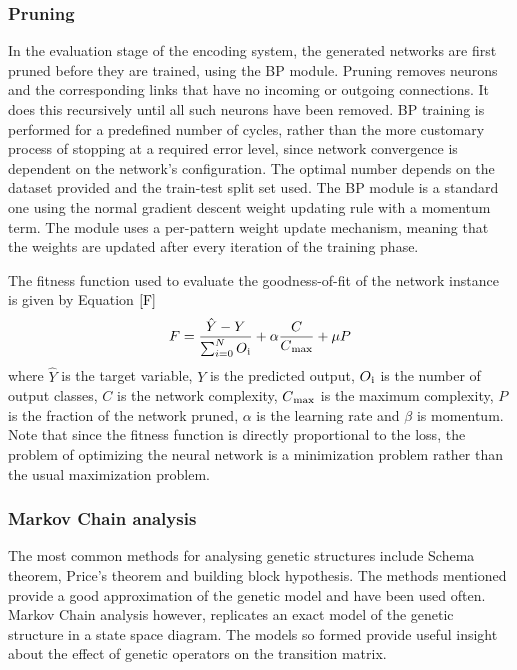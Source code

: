\documentclass[conference]{IEEEtran}
\begin{document}
\subsubsection{\textbf{Pruning}}
In the evaluation stage of the encoding system, the generated networks are first pruned before they are trained, using the BP module. Pruning removes neurons and the corresponding links that have no incoming or outgoing connections. It does this recursively until all such neurons have been removed. BP training is performed for a predefined number of cycles, rather than the more customary process of stopping at a required error level, since network convergence is dependent on the network's configuration. The optimal number depends on the dataset provided and the train-test split set used. The BP module is a standard one using the normal gradient descent weight updating rule with a momentum term. The module uses a per-pattern weight update mechanism, meaning that the weights are updated after every iteration of the training phase.

The fitness function used to evaluate the goodness-of-fit of the network instance is given by Equation $\ref{F}$ 
\begin{equation}
F = \frac{\hat{Y}-Y}{\sum_{i=0}^{N}O\textsubscript{i}} + \alpha\frac{C}{C\textsubscript{max}} + \mu P
\label{F}
\end{equation}
where $\hat{Y}$ is the target variable, $Y$ is the predicted output, $O\textsubscript{i}$ is the number of output classes, $C$ is the network complexity, $C\textsubscript{max}$ is the maximum complexity, $P$ is the fraction of the network pruned, $\alpha$ is the learning rate and $\beta$ is momentum.  Note that since the fitness function is directly proportional to the loss, the problem of optimizing the neural network is a minimization problem rather than the usual maximization problem. 

\subsubsection{\textbf{Markov Chain analysis}}

The most common methods for analysing genetic structures include Schema theorem, Price's theorem and building block hypothesis. The methods mentioned provide a good approximation of the genetic model and have been used often. Markov Chain analysis however, replicates an exact model of the genetic structure in a state space diagram. The models so formed provide useful insight about the effect of genetic operators on the transition matrix.  
\end{document}
